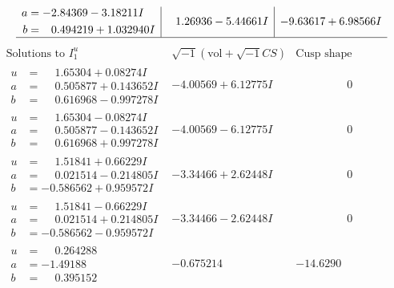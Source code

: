 \documentclass[1p]{elsarticle_modified}
\theoremstyle{definition}
\newcommand{\I}{\sqrt{-1}}
\begin{document}
$$\begin{array}{c|c|c}
\begin{aligned}
a &= -2.84369 - 3.18211 I \\
b &= \phantom{-}0.494219 + 1.032940 I\end{aligned}
 & \phantom{-}1.26936 - 5.44661 I & -9.63617 + 6.98566 I\\
 \hline 
 \end{array}$$\newpage$$\begin{array}{c|c|c}  
\text{Solutions to }I^u_{1}& \I (\text{vol} + \sqrt{-1}CS) & \text{Cusp shape}\\
 \hline 
\begin{aligned}
u &= \phantom{-}1.65304 + 0.08274 I \\
a &= \phantom{-}0.505877 + 0.143652 I \\
b &= \phantom{-}0.616968 - 0.997278 I\end{aligned}
 & -4.00569 + 6.12775 I & \phantom{-0.000000 } 0 \\ \hline\begin{aligned}
u &= \phantom{-}1.65304 - 0.08274 I \\
a &= \phantom{-}0.505877 - 0.143652 I \\
b &= \phantom{-}0.616968 + 0.997278 I\end{aligned}
 & -4.00569 - 6.12775 I & \phantom{-0.000000 } 0 \\ \hline\begin{aligned}
u &= \phantom{-}1.51841 + 0.66229 I \\
a &= \phantom{-}0.021514 - 0.214805 I \\
b &= -0.586562 + 0.959572 I\end{aligned}
 & -3.34466 + 2.62448 I & \phantom{-0.000000 } 0 \\ \hline\begin{aligned}
u &= \phantom{-}1.51841 - 0.66229 I \\
a &= \phantom{-}0.021514 + 0.214805 I \\
b &= -0.586562 - 0.959572 I\end{aligned}
 & -3.34466 - 2.62448 I & \phantom{-0.000000 } 0 \\ \hline\begin{aligned}
u &= \phantom{-}0.264288\phantom{ +0.000000I} \\
a &= -1.49188\phantom{ +0.000000I} \\
b &= \phantom{-}0.395152\phantom{ +0.000000I}\end{aligned}
 & -0.675214\phantom{ +0.000000I} & -14.6290\phantom{ +0.000000I} \\ \hline\begin{aligned}

\end{aligned}
\end{array}$$
\end{document}
